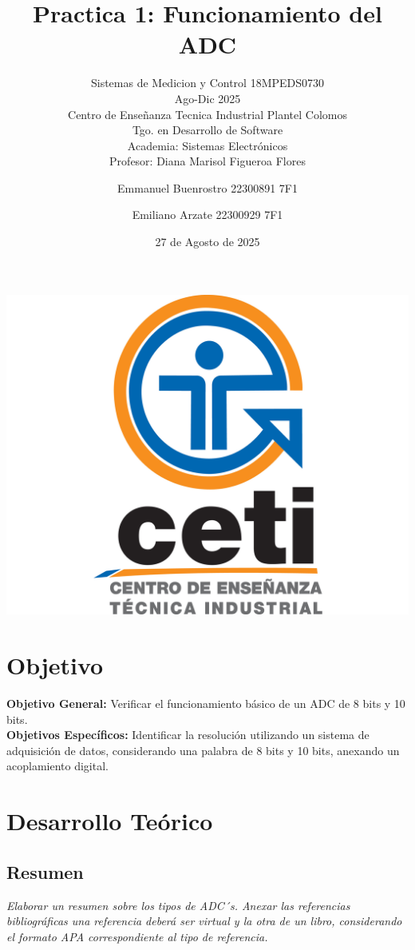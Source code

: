 \documentclass[11pt]{scrartcl}
\title {Practica 1: Funcionamiento del ADC}
\subtitle{Sistemas de Medicion y Control 18MPEDS0730 \\ Ago-Dic 2025 \\ Centro de Enseñanza Tecnica Industrial Plantel Colomos\\Tgo. en Desarrollo de Software \\ Academia: Sistemas Electrónicos\\Profesor: Diana Marisol Figueroa Flores }
\date{27 de Agosto de 2025}
\author{Emmanuel Buenrostro 22300891 7F1 \\ \and Emiliano Arzate 22300929 7F1 \\}
\newcommand{\indicacion}[1]{\noindent\textit{\small #1}}
\begin{document}
\maketitle
\begin{center}
   \includegraphics[scale=0.15]{../../cetilogo.jpg} 
\end{center}
\newpage


\section{Objetivo}

\textbf{Objetivo General:} Verificar el funcionamiento básico de un ADC de 8 bits y 10 bits. \\


\textbf{Objetivos Específicos:} Identificar la resolución utilizando un sistema de adquisición de datos, considerando una palabra de 8 bits y 10 bits, anexando un acoplamiento digital.

\section{Desarrollo Teórico}

\subsection{Resumen }

\indicacion{
    Elaborar un resumen sobre los tipos de ADC´s. Anexar las referencias bibliográficas una referencia deberá ser virtual y la otra de un libro, considerando el formato APA correspondiente al tipo de referencia.
}
\end{document}
